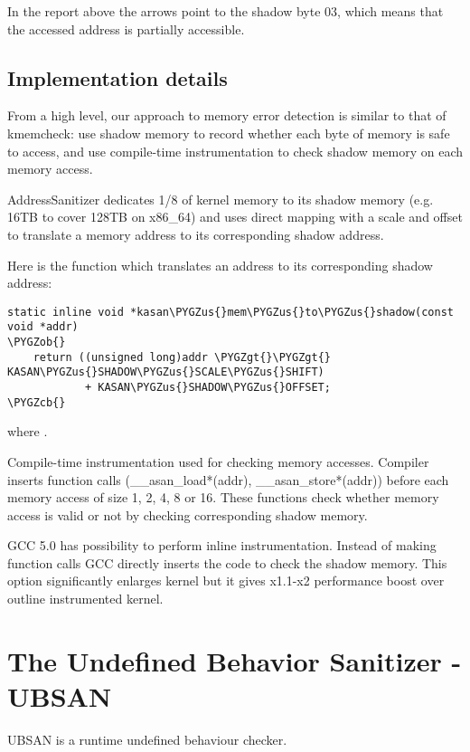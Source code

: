 \documentclass[a4paper,8pt,english]{sphinxmanual}
\def\PYGZus{\char`\_}
\def\PYGZob{\char`\{}
\def\PYGZcb{\char`\}}
\def\PYGZgt{\char`\>}
\begin{document}
In the report above the arrows point to the shadow byte 03, which means that
the accessed address is partially accessible.


\section{Implementation details}
\label{dev-tools/kasan:implementation-details}
From a high level, our approach to memory error detection is similar to that
of kmemcheck: use shadow memory to record whether each byte of memory is safe
to access, and use compile-time instrumentation to check shadow memory on each
memory access.

AddressSanitizer dedicates 1/8 of kernel memory to its shadow memory
(e.g. 16TB to cover 128TB on x86\_64) and uses direct mapping with a scale and
offset to translate a memory address to its corresponding shadow address.

Here is the function which translates an address to its corresponding shadow
address:

\begin{Verbatim}[commandchars=\\\{\}]
static inline void *kasan\PYGZus{}mem\PYGZus{}to\PYGZus{}shadow(const void *addr)
\PYGZob{}
    return ((unsigned long)addr \PYGZgt{}\PYGZgt{} KASAN\PYGZus{}SHADOW\PYGZus{}SCALE\PYGZus{}SHIFT)
            + KASAN\PYGZus{}SHADOW\PYGZus{}OFFSET;
\PYGZcb{}
\end{Verbatim}

where .

Compile-time instrumentation used for checking memory accesses. Compiler inserts
function calls (\_\_asan\_load*(addr), \_\_asan\_store*(addr)) before each memory
access of size 1, 2, 4, 8 or 16. These functions check whether memory access is
valid or not by checking corresponding shadow memory.

GCC 5.0 has possibility to perform inline instrumentation. Instead of making
function calls GCC directly inserts the code to check the shadow memory.
This option significantly enlarges kernel but it gives x1.1-x2 performance
boost over outline instrumented kernel.


\chapter{The Undefined Behavior Sanitizer - UBSAN}
\label{dev-tools/ubsan::doc}\label{dev-tools/ubsan:the-undefined-behavior-sanitizer-ubsan}
UBSAN is a runtime undefined behaviour checker.
\end{document}
